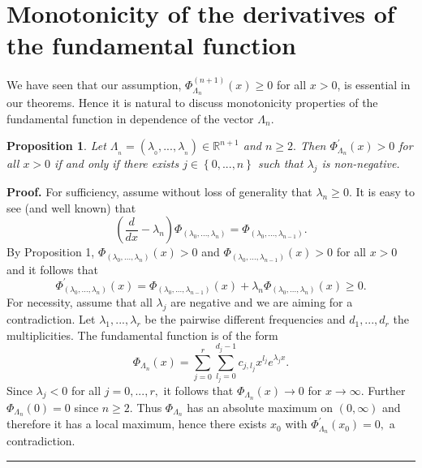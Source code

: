 \documentclass[11pt]{article}%
\newtheorem{proposition}[theorem]{Proposition}
\newenvironment{proof}[1][Proof]{\textbf{#1.} }{\ \rule{0.5em}{0.5em}}
\begin{document}
\section{Monotonicity of the derivatives of the fundamental function}

We have seen that our assumption, $\Phi_{\Lambda_{n}}^{\left(  n+1\right)
}\left(  x\right)  \geq0$ for all $x>0$, is essential in our theorems. Hence
it is natural to discuss monotonicity properties of the fundamental function
in dependence of the vector $\Lambda_{n}.$

\begin{proposition}
\label{Prop3}Let $\Lambda_{_{n}}=\left(  \lambda_{_{0}},...,\lambda_{_{n}%
}\right)  \in\mathbb{R}^{n+1}$ and $n\geq2.$ Then $\Phi_{\Lambda_{n}}^{\prime
}\left(  x\right)  >0$ for all $x>0$ if and only if there exists $j\in\left\{
0,...,n\right\}  $ such that $\lambda_{j}$ is non-negative.
\end{proposition}

\begin{proof}
For sufficiency, assume without loss of generality that $\lambda_{n}\geq0.$ It
is easy to see (and well known) that
\[
\left(  \frac{d}{dx}-\lambda_{n}\right)  \Phi_{\left(  \lambda_{0}%
,...,\lambda_{n}\right)  }=\Phi_{\left(  \lambda_{0},...,\lambda_{n-1}\right)
}.
\]
By Proposition 1, $\Phi_{\left(  \lambda_{0},...,\lambda_{n}\right)  }\left(
x\right)  >0$ and $\Phi_{\left(  \lambda_{0},...,\lambda_{n-1}\right)
}\left(  x\right)  >0$ for all $x>0$ and it follows that
\[
\Phi_{\left(  \lambda_{0},...,\lambda_{n}\right)  }^{\prime}\left(  x\right)
=\Phi_{\left(  \lambda_{0},...,\lambda_{n-1}\right)  }\left(  x\right)
+\lambda_{n}\Phi_{\left(  \lambda_{0},...,\lambda_{n}\right)  }\left(
x\right)  \geq0.
\]
For necessity, assume that all $\lambda_{j}$ are negative and we are aiming
for a contradiction. Let $\lambda_{1},...,\lambda_{r}$ be the pairwise
different frequencies and $d_{1},...,d_{r}$ the multiplicities. The
fundamental function is of the form
\[
\Phi_{\Lambda_{n}}\left(  x\right)  =%
{\displaystyle\sum_{j=0}^{r}}
{\displaystyle\sum_{l_{j}=0}^{d_{j}-1}}
c_{j,l_{j}}x^{l_{j}}e^{\lambda_{j}x}.
\]
Since $\lambda_{j}<0$ for all $j=0,...,r,$ it follows that $\Phi_{\Lambda_{n}%
}\left(  x\right)  \rightarrow0$ for $x\rightarrow\infty.$ Further
$\Phi_{\Lambda_{n}}\left(  0\right)  =0$ since $n\geq2.$ Thus $\Phi
_{\Lambda_{n}}$ has an absolute maximum on $\left(  0,\infty\right)  $ and
therefore it has a local maximum, hence there exists $x_{0}$ with
$\Phi_{\Lambda_{n}}^{\prime}\left(  x_{0}\right)  =0,$ a contradiction.
\end{proof}
\end{document}
